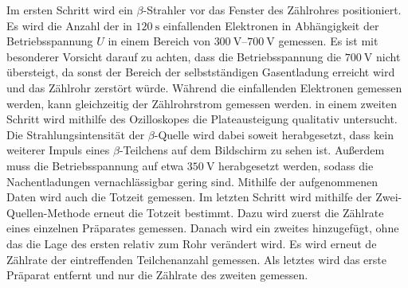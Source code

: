 Im ersten Schritt wird ein $\beta$-Strahler vor das Fenster des Zählrohres positioniert. Es wird die Anzahl der in $\SI{120}{\second}$ einfallenden Elektronen in Abhängigkeit der Betriebsspannung $U$ in
einem Bereich von $\SIrange{300}{700}{\volt}$ gemessen. Es ist mit besonderer Vorsicht darauf zu achten, dass die Betriebsspannung die $\SI{700}{\volt}$ nicht übersteigt, da sonst der
Bereich der selbstständigen Gasentladung erreicht wird und das Zählrohr zerstört würde.
Während die einfallenden Elektronen gemessen werden, kann gleichzeitig der Zählrohrstrom gemessen werden. \newline
in einem zweiten Schritt wird mithilfe des Ozilloskopes die Plateausteigung qualitativ untersucht. Die Strahlungsintensität der $\beta$-Quelle wird dabei soweit herabgesetzt, dass kein weiterer Impuls eines 
$\beta$-Teilchens auf dem Bildschirm zu sehen ist. Außerdem muss die Betriebsspannung auf etwa $\SI{350}{\volt}$ herabgesetzt werden, sodass die Nachentladungen vernachlässigbar gering sind.
Mithilfe der aufgenommenen Daten wird auch die Totzeit gemessen. \newline
Im letzten Schritt wird mithilfe der Zwei-Quellen-Methode erneut die Totzeit bestimmt. Dazu wird zuerst die Zählrate eines einzelnen Präparates gemessen. Danach wird ein zweites hinzugefügt, ohne das die Lage des ersten relativ zum Rohr verändert wird.
Es wird erneut de Zählrate der eintreffenden Teilchenanzahl gemessen. Als letztes wird das erste Präparat entfernt und nur die Zählrate des zweiten gemessen.